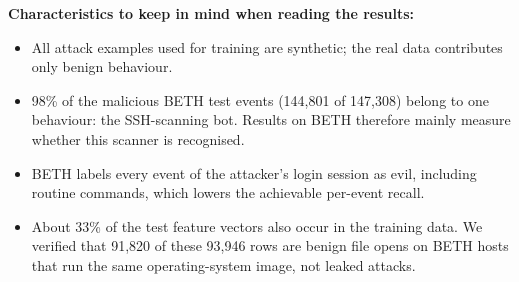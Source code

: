 \textbf{Characteristics to keep in mind when reading the results:}
\begin{itemize}
    \item All attack examples used for training are synthetic; the real data contributes
          only benign behaviour.
    \item 98\% of the malicious BETH test events (144,801 of 147,308) belong to one
          behaviour: the SSH-scanning bot. Results on BETH therefore mainly measure whether
          this scanner is recognised.
    \item BETH labels every event of the attacker's login session as evil, including
          routine commands, which lowers the achievable per-event recall.
    \item About 33\% of the test feature vectors also occur in the training data. We
          verified that 91,820 of these 93,946 rows are benign file opens on BETH hosts that
          run the same operating-system image, not leaked attacks.
\end{itemize}
